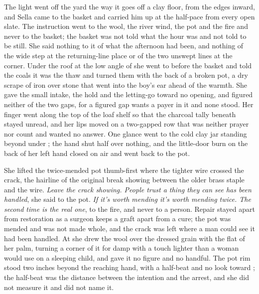 \scenebreak

The light went off the yard the way it goes off a clay floor, from the edges inward, and Sella came to the basket and carried him up  at the half-pace from every open slate. The instruction went to the wool, the river wind, the pot and the fire and never to the basket; the basket was not told what the hour was and not told to be still. She said nothing to it of what the afternoon had been, and nothing of the wide step at the returning-line place or of the two unswept lines at the corner. Under the roof at the low angle of  she went to  before the basket and told the coals it was the thaw and turned them with the back of a broken pot, a dry scrape of iron over stone that went into the boy's ear ahead of the warmth. She gave the small intake, the hold and the letting-go toward no opening, and figured neither of the two gaps, for a figured gap wants a payer in it and none stood. Her finger went along the top of the loaf shelf so that the charcoal tally beneath stayed unread, and her lips moved on a two-gapped row that was neither prayer nor count and wanted no answer. One glance went to the cold clay jar standing beyond  under ; the hand shut half over nothing, and the little-door burn on the back of her left hand closed on air and went back to the pot.

She lifted the twice-mended pot thumb-first where the tighter wire crossed the crack, the hairline of the original break showing between the older brass staple and the wire. \emph{Leave the crack showing. People trust a thing they can see has been handled}, she said to the pot. \emph{If it's worth mending it's worth mending twice. The second time is the real one}, to the fire, and never to a person. Repair stayed apart from restoration as a surgeon keeps a graft apart from a cure; the pot was mended and was not made whole, and the crack was left where a man could see it had been handled. At  she drew the wool over the dressed grain with the flat of her palm, turning a corner of it for damp with a touch lighter than a woman would use on a sleeping child, and gave it no figure and no handful. The pot rim stood two inches beyond the reaching hand, with a half-beat and no look toward ; the half-beat was the distance between the intention and the arrest, and she did not measure it and did not name it.

